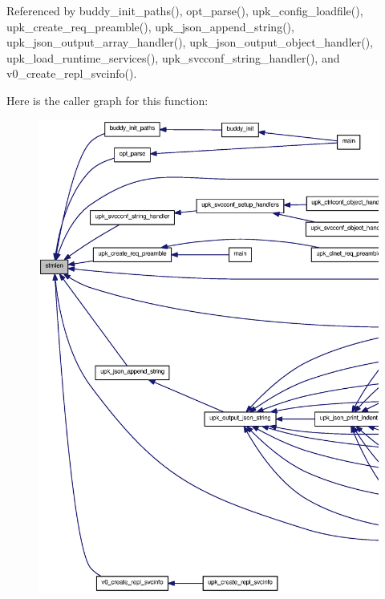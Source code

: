 Referenced by buddy\_\-init\_\-paths(), opt\_\-parse(), upk\_\-config\_\-loadfile(), upk\_\-create\_\-req\_\-preamble(), upk\_\-json\_\-append\_\-string(), upk\_\-json\_\-output\_\-array\_\-handler(), upk\_\-json\_\-output\_\-object\_\-handler(), upk\_\-load\_\-runtime\_\-services(), upk\_\-svcconf\_\-string\_\-handler(), and v0\_\-create\_\-repl\_\-svcinfo().



Here is the caller graph for this function:
\nopagebreak
\begin{figure}[H]
\begin{center}
\leavevmode
\includegraphics[width=400pt]{upk__compat_8h_a46f2e73d24c7ab8289f978f80647478c_icgraph}
\end{center}
\end{figure}


